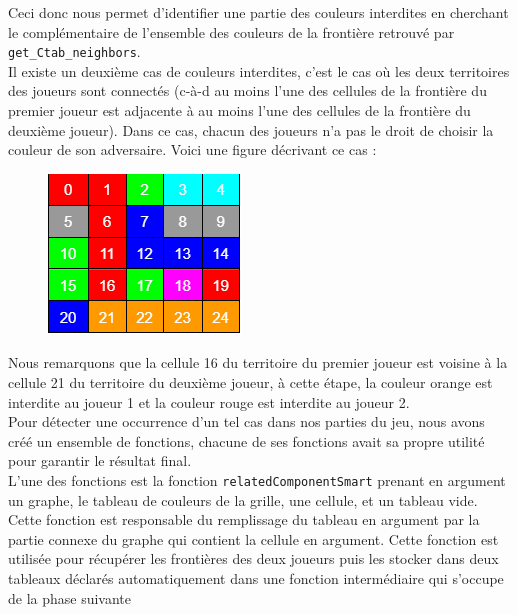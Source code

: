 \documentclass[11pt]{article}
\begin{document}
Ceci donc nous permet d'identifier une partie des couleurs interdites en cherchant le complémentaire de l'ensemble des couleurs de la frontière retrouvé par \texttt{get\_Ctab\_neighbors}.\\


Il existe un deuxième cas de couleurs interdites, c'est le cas où les deux territoires des joueurs sont connectés (c-à-d au moins l'une des cellules de la frontière du premier joueur est adjacente à au moins l'une des cellules de la frontière du deuxième joueur). Dans ce cas, chacun des joueurs n'a pas le droit de choisir la couleur de son adversaire. Voici une figure décrivant ce cas : 

\begin{figure}[h]
    \begin{center}
        \includegraphics[scale=0.8]{./img/connected.PNG}
    \end{center}
\end{figure}
Nous remarquons que la cellule 16 du territoire du premier joueur est voisine à la cellule 21 du territoire du deuxième joueur, à cette étape, la couleur orange est interdite au joueur 1 et la couleur rouge est interdite au joueur 2. \\

Pour détecter une occurrence d'un tel cas dans nos parties du jeu, nous avons créé un ensemble de fonctions, chacune de ses fonctions avait sa propre utilité pour garantir le résultat final.\\



L'une des fonctions est la fonction \texttt{relatedComponentSmart} prenant en argument un graphe, le tableau de couleurs de la grille, une cellule, et un tableau vide. Cette fonction est responsable du remplissage du tableau en argument par la partie connexe du graphe qui contient la cellule en argument. Cette fonction est utilisée pour récupérer les frontières des deux joueurs puis les stocker dans deux tableaux déclarés automatiquement dans une fonction intermédiaire qui s'occupe de la phase suivante\\
\end{document}
